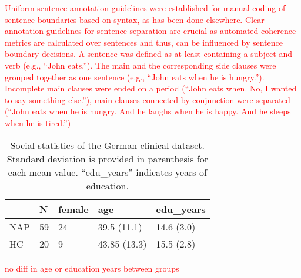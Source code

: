 \textcolor{red}{Uniform sentence annotation guidelines were established for manual coding of sentence boundaries based on syntax, as has been done elsewhere. Clear annotation guidelines for sentence separation are crucial as automated coherence metrics are calculated over sentences and thus, can be influenced by sentence boundary decisions. A sentence was defined as at least containing a subject and verb (e.g., “John eats.”). The main and the corresponding side clauses were grouped together as one sentence (e.g., “John eats when he is hungry.”). Incomplete main clauses were ended on a period (“John eats when. No, I wanted to say something else.”), main clauses connected by conjunction were separated (“John eats when he is hungry. And he laughs when he is happy. And he sleeps when he is tired.”)}

\begin{table}[h!]
\begin{center}
\begin{tabular}{lllll}
\hline
& \textbf{N} & \textbf{female} & \textbf{age} & \textbf{edu\_years} \\ 
\hline
NAP & 59         & 24              & 39.5 (11.1)  & 14.6 (3.0)               \\
HC  & 20         & 9               & 43.85 (13.3) & 15.5 (2.8)               \\ 
\hline
\end{tabular}
\captionsetup{width=\textwidth}
\caption[German Clinical Dataset.]{\label{tab:data:de:sample} Social statistics of the German clinical dataset. Standard deviation is provided in parenthesis for each mean value. ``edu\_years'' indicates years of education.}
\end{center}
\end{table}

\textcolor{red}{no diff in age or education years between groups}


